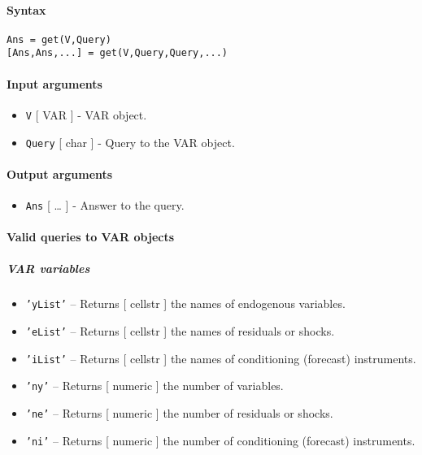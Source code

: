 


	\paragraph{Syntax}\label{syntax}

\begin{verbatim}
Ans = get(V,Query)
[Ans,Ans,...] = get(V,Query,Query,...)
\end{verbatim}

\paragraph{Input arguments}\label{input-arguments}

\begin{itemize}
\item
  \texttt{V} {[} VAR {]} - VAR object.
\item
  \texttt{Query} {[} char {]} - Query to the VAR object.
\end{itemize}

\paragraph{Output arguments}\label{output-arguments}

\begin{itemize}
\itemsep1pt\parskip0pt
\item
  \texttt{Ans} {[} \ldots{} {]} - Answer to the query.
\end{itemize}

\paragraph{Valid queries to VAR
objects}\label{valid-queries-to-var-objects}

\subparagraph{VAR variables}\label{var-variables}

\begin{itemize}
\item
  \texttt{'yList'} -- Returns {[} cellstr {]} the names of endogenous
  variables.
\item
  \texttt{'eList'} -- Returns {[} cellstr {]} the names of residuals or
  shocks.
\item
  \texttt{'iList'} -- Returns {[} cellstr {]} the names of conditioning
  (forecast) instruments.
\item
  \texttt{'ny'} -- Returns {[} numeric {]} the number of variables.
\item
  \texttt{'ne'} -- Returns {[} numeric {]} the number of residuals or
  shocks.
\item
  \texttt{'ni'} -- Returns {[} numeric {]} the number of conditioning
  (forecast) instruments.
\end{itemize}

